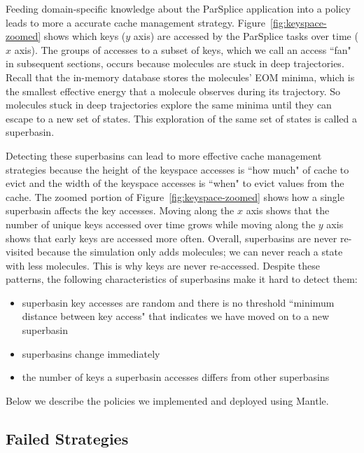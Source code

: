Feeding domain-specific knowledge about the ParSplice application into a policy
leads to more a accurate cache management strategy.
Figure~\ref{fig:keyspace-zoomed} shows which keys (\(y\) axis) are accessed by
the ParSplice tasks over time (\(x\) axis). The groups of accesses to a subset
of keys, which we call an access ``fan" in subsequent sections, occurs because
molecules are stuck in deep trajectories. Recall that the in-memory database
stores the molecules' EOM minima, which is the smallest effective energy that a
molecule observes during its trajectory. So molecules stuck in deep
trajectories explore the same minima until they can escape to a new set of
states. This exploration of the same set of states is called a superbasin. 

Detecting these superbasins can lead to more effective cache management
strategies because the height of the keyspace accesses is ``how much" of cache
to evict and the width of the keyspace accesses is ``when" to evict values from
the cache.  The zoomed portion of Figure~\ref{fig:keyspace-zoomed} shows how a
single superbasin affects the key accesses. Moving along the \(x\) axis shows
that the number of unique keys accessed over time grows while moving along the
\(y\) axis shows that early keys are accessed more often.  Overall, superbasins
are never re-visited because the simulation only adds molecules; we can never
reach a state with less molecules. This is why keys are never re-accessed.
Despite these patterns, the following characteristics of superbasins make it
hard to detect them:

\begin{itemize}

  \item superbasin key accesses are random and there is no threshold ``minimum distance
  between key access" that indicates we have moved on to a new superbasin

  \item superbasins change immediately

  \item the number of keys a superbasin accesses differs from other superbasins

\end{itemize}

Below we describe the policies we implemented and deployed using Mantle.

\subsection{Failed Strategies}

